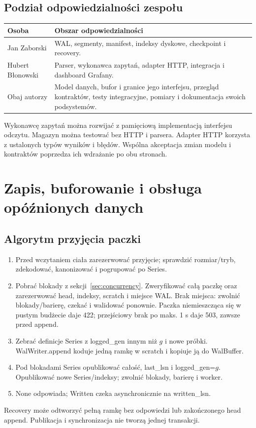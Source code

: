 \documentclass[11pt,a4paper]{article}
\begin{document}
\subsection{Podział odpowiedzialności zespołu}
\begin{tabularx}{\linewidth}{P{43mm}Y}
\toprule
Osoba & Obszar odpowiedzialności\\ \midrule
Jan Zaborski & WAL, segmenty, manifest, indeksy dyskowe, checkpoint i recovery.\\
Hubert Błonowski & Parser, wykonawca zapytań, adapter HTTP, integracja i dashboard Grafany.\\
Obaj autorzy & Model danych, bufor i granice jego interfejsu, przegląd kontraktów,
testy integracyjne, pomiary i dokumentacja swoich podsystemów.\\
\bottomrule
\end{tabularx}

Wykonawcę zapytań można rozwijać z pamięciową implementacją interfejsu
odczytu. Magazyn można testować bez HTTP i parsera. Adapter HTTP korzysta
z ustalonych typów wyników i błędów. Wspólna akceptacja zmian modelu
i kontraktów poprzedza ich wdrażanie po obu stronach.

\section{Zapis, buforowanie i obsługa opóźnionych danych}
\label{sec:write}


\subsection{Algorytm przyjęcia paczki}
\begin{enumerate}
\item Przed wczytaniem ciała zarezerwować przyjęcie;
sprawdzić rozmiar/tryb, zdekodować, kanonizować i pogrupować po Series.
\item Pobrać blokady z sekcji~\ref{sec:concurrency}. Zweryfikować
całą paczkę oraz zarezerwować head, indeksy, scratch i miejsce WAL.
Brak miejsca: zwolnić blokady/barierę, czekać i walidować ponownie.
Paczka niemieszcząca się w pustym budżecie daje 422; przejściowy brak
po maks. 1 s daje 503, zawsze przed append.
\item Zebrać definicje Series z logged\_gen innym niż $g$ i nowe próbki.
WalWriter.append koduje jedną ramkę w scratch i kopiuje ją do WalBuffer.
\item Pod blokadami Series opublikować całość, last\_lsn i logged\_gen=$g$.
Opublikować nowe Series/indeksy; zwolnić blokady, barierę i worker.
\item None odpowiada; Written czeka asynchronicznie na written\_lsn.
\end{enumerate}
Recovery może odtworzyć pełną ramkę bez odpowiedzi lub zakończonego
head append. Publikacja i synchronizacja nie tworzą jednej transakcji.
\end{document}
